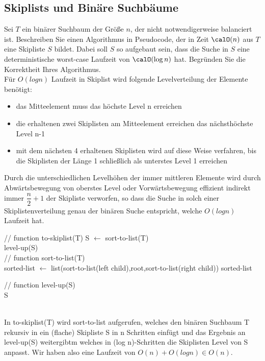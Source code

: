 \documentclass[paper=a4, fontsize=11pt]{scrartcl}
\numberwithin{equation}{section}
\numberwithin{figure}{section}
\numberwithin{table}{section}
\begin{document}
\subsection{Skiplists und Binäre Suchbäume}
Sei $T$ ein binärer Suchbaum der Größe $n$, der nicht notwendigerweise balanciert ist.
Beschreiben Sie einen Algorithmus in Pseudocode, der in Zeit $\calO(n)$ aus $T$ eine Skipliste $S$ bildet.
Dabei soll $S$ so aufgebaut sein, dass die Suche in $S$ eine deterministische
worst-case Laufzeit von $\calO(\log n)$ hat.
Begründen Sie die Korrektheit Ihres Algorithmus. \\

Für $O(log n)$ Laufzeit in Skiplist wird folgende Levelverteilung der Elemente benötigt: 
\begin{itemize}
\item das Mitteelement muss das höchste Level n erreichen
\item die erhaltenen zwei Skiplisten am Mitteelement erreichen das nächsthöchste Level n-1
\item mit dem nächsten 4 erhaltenen Skiplisten wird auf diese Weise verfahren, bis die Skiplisten der Länge 1 schließlich als unterstes Level 1 erreichen
\end{itemize}
Durch die unterschiedlichen Levelhöhen der immer mittleren Elemente wird durch Abwärtsbewegung von oberstes Level oder Vorwärtsbewegung effizient indirekt immer $\dfrac{n}{2}+1$ der Skipliste verworfen, so dass die Suche in solch einer Skiplistenverteilung genau der binären Suche entspricht, welche $O(log n)$ Laufzeit hat.

\begin{algorithm}[H]
\SetAlgoLined
// function to-skiplist(T)
S $\leftarrow$ sort-to-list(T) \\
level-up(S) \\

// function sort-to-list(T) \\
sorted-list $\leftarrow$ list(sort-to-list(left child),root,sort-to-list(right child))
\Return sorted-list

// function level-up(S) \\
\Return S
\end{algorithm} \\

In to-skiplist(T) wird sort-to-list aufgerufen, welches den binären Suchbaum T rekursiv in ein (flache) Skipliste S in n Schritten einfügt und das Ergebnis an level-up(S) weitergibtm welches in (log n)-Schritten die Skiplisten Level von S anpasst. Wir haben also eine Laufzeit von $O(n)+O(log n) \in O(n)$.
 
\end{document}
